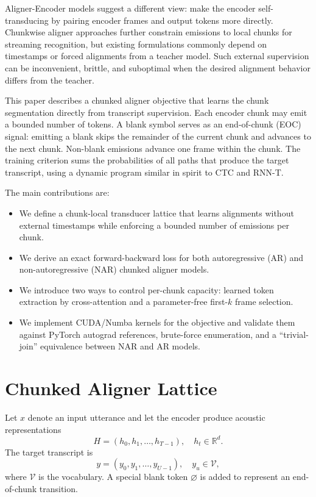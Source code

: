 \documentclass[conference]{IEEEtran}
\newcommand{\blank}{\varnothing}
\begin{document}
Aligner-Encoder models \cite{stooke2025aligner} suggest a different view: make
the encoder self-transducing by pairing encoder frames and output tokens more
directly. Chunkwise aligner approaches further constrain emissions to local
chunks for streaming recognition, but existing formulations commonly depend on
timestamps or forced alignments from a teacher model. Such external supervision
can be inconvenient, brittle, and suboptimal when the desired alignment behavior
differs from the teacher.

This paper describes a chunked aligner objective that learns the chunk
segmentation directly from transcript supervision. Each encoder chunk may emit a
bounded number of tokens. A blank symbol serves as an end-of-chunk (EOC) signal:
emitting a blank skips the remainder of the current chunk and advances to the
next chunk. Non-blank emissions advance one frame within the chunk. The training
criterion sums the probabilities of all paths that produce the target transcript,
using a dynamic program similar in spirit to CTC and RNN-T.

The main contributions are:
\begin{itemize}
  \item We define a chunk-local transducer lattice that learns alignments without
  external timestamps while enforcing a bounded number of emissions per chunk.
  \item We derive an exact forward-backward loss for both autoregressive (AR) and
  non-autoregressive (NAR) chunked aligner models.
  \item We introduce two ways to control per-chunk capacity: learned token
  extraction by cross-attention and a parameter-free first-$k$ frame selection.
  \item We implement CUDA/Numba kernels for the objective and validate them
  against PyTorch autograd references, brute-force enumeration, and a
  ``trivial-join'' equivalence between NAR and AR models.
\end{itemize}

\section{Chunked Aligner Lattice}

Let $x$ denote an input utterance and let the encoder produce acoustic
representations
\begin{equation}
  H = (h_0, h_1, \ldots, h_{T-1}), \quad h_t \in \mathbb{R}^d.
\end{equation}
The target transcript is
\begin{equation}
  y = (y_0, y_1, \ldots, y_{U-1}), \quad y_u \in \mathcal{V},
\end{equation}
where $\mathcal{V}$ is the vocabulary. A special blank token $\blank$ is added to
represent an end-of-chunk transition.
\end{document}
